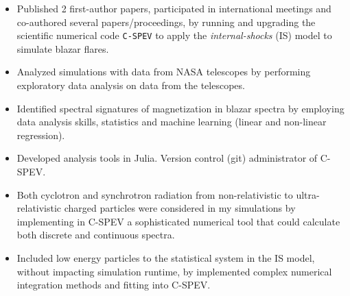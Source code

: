 {%
\begin{itemize}
	\item Published 2 first-author papers, participated in international meetings and co-authored several papers/proceedings, by running and upgrading the scientific numerical code \texttt{C-SPEV} to apply the \emph{internal-shocks} (IS) model to simulate blazar flares.
	\item Analyzed simulations with data from NASA telescopes by performing exploratory data analysis on data from the telescopes.
	\item Identified spectral signatures of magnetization in blazar spectra by employing data analysis skills, statistics and machine learning (linear and non-linear regression).
	\item Developed analysis tools in Julia. Version control (git) administrator of C-SPEV.
	\item Both cyclotron and synchrotron radiation from non-relativistic to ultra-relativistic charged particles were considered in my simulations by implementing in C-SPEV a sophisticated numerical tool that could calculate both discrete and continuous spectra.
	\item Included low energy particles to the statistical system in the IS model, without impacting simulation runtime, by implemented complex numerical integration methods and fitting into C-SPEV.
\end{itemize}
}
